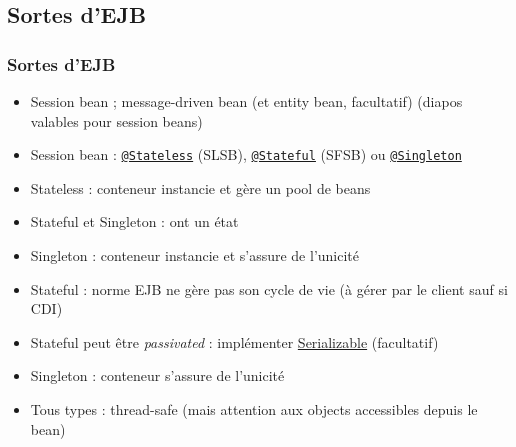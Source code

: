 \documentclass[english, french]{beamer}
\begin{document}
\subsection{Sortes d’EJB}
\begin{frame}
	\frametitle{Sortes d’EJB}
	\begin{itemize}
		\item Session bean ; message-driven bean {\tiny (et entity bean, facultatif)} {\tiny (diapos valables pour session beans)}
		\item Session bean : \href{http://docs.oracle.com/javaee/7/api/javax/ejb/Stateless.html}{\texttt{@Stateless}} (SLSB), \href{http://docs.oracle.com/javaee/7/api/javax/ejb/Stateful.html}{\texttt{@Stateful}} (SFSB) ou \href{http://docs.oracle.com/javaee/7/api/javax/ejb/Singleton.html}{\texttt{@Singleton}}
		\item Stateless : conteneur instancie et gère un pool de beans
		\item Stateful et Singleton : ont un état
		\item Singleton : conteneur instancie et s’assure de l’unicité
		\item Stateful : norme EJB ne gère pas son cycle de vie (à gérer par le client {\tiny sauf si CDI})
		\item Stateful peut être \emph{passivated} : implémenter \href{https://docs.oracle.com/javase/8/docs/api/java/io/Serializable.html}{Serializable} {\tiny (facultatif)}
		\item Singleton : conteneur s’assure de l’unicité
		\item Tous types : thread-safe {\tiny (mais attention aux objects accessibles depuis le bean)}
	\end{itemize}
\end{frame}
\end{document}
